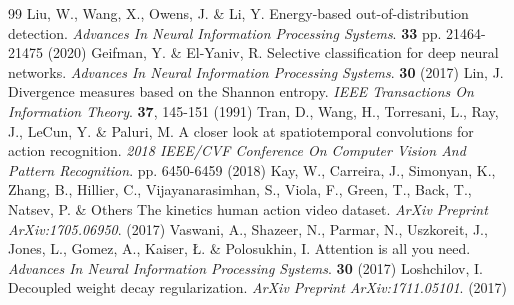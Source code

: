 \documentclass[conference]{IEEEtran}
\begin{document}
\begin{thebibliography}{99}
Liu, W., Wang, X., Owens, J. \& Li, Y. Energy-based out-of-distribution detection. {\em Advances In Neural Information Processing Systems}. \textbf{33} pp. 21464-21475 (2020)
Geifman, Y. \& El-Yaniv, R. Selective classification for deep neural networks. {\em Advances In Neural Information Processing Systems}. \textbf{30} (2017)
Lin, J. Divergence measures based on the Shannon entropy. {\em IEEE Transactions On Information Theory}. \textbf{37}, 145-151 (1991)
Tran, D., Wang, H., Torresani, L., Ray, J., LeCun, Y. \& Paluri, M. A closer look at spatiotemporal convolutions for action recognition. {\em 2018 IEEE/CVF Conference On Computer Vision And Pattern Recognition}. pp. 6450-6459 (2018)
Kay, W., Carreira, J., Simonyan, K., Zhang, B., Hillier, C., Vijayanarasimhan, S., Viola, F., Green, T., Back, T., Natsev, P. \& Others The kinetics human action video dataset. {\em ArXiv Preprint ArXiv:1705.06950}. (2017)
Vaswani, A., Shazeer, N., Parmar, N., Uszkoreit, J., Jones, L., Gomez, A., Kaiser, Ł. \& Polosukhin, I. Attention is all you need. {\em Advances In Neural Information Processing Systems}. \textbf{30} (2017)
Loshchilov, I. Decoupled weight decay regularization. {\em ArXiv Preprint ArXiv:1711.05101}. (2017)

\end{thebibliography}
\end{document}
